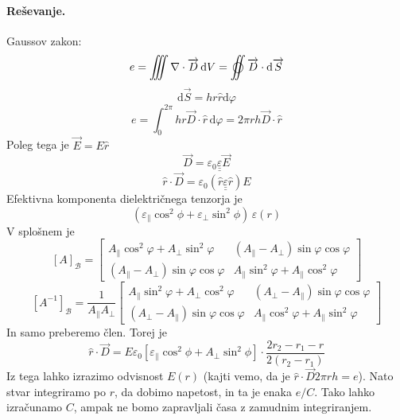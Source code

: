 \documentclass[a4paper]{article}
\newcommand{\vct}[1]{\overrightarrow{#1}}
\newcommand{\dif}{\mathrm{d}}
\newcommand{\duline}[1]{\underline{\underline{#1}}}
\begin{document}
\paragraph{Reševanje.} Gaussov zakon:
$$e = \iiint \nabla \cdot \vct{D} \, \dif V = \varoiint \vct{D}\cdot\dif\vct{S}$$
$$\dif \vct{S} = h r\widehat{r} \dif \varphi$$
$$e = \int_{0}^{2\pi} hr \vct{D} \cdot \widehat{r}\,\dif\varphi = 2\pi r h \vct{D}\cdot\widehat{r}$$
Poleg tega je $\vct{E} = E\widehat{r}$
$$\vct{D} = \varepsilon_0\duline{\varepsilon}\vct{E}$$
$$\widehat{r}\cdot\vct{D} = \varepsilon_0 \left(\widehat{r}\duline{\varepsilon}\widehat{r}\right)E$$
Efektivna komponenta dielektričnega tenzorja je $$(\varepsilon_\parallel \cos^2\phi + \varepsilon_\perp \sin^2\phi)\,\varepsilon(r)$$
V splošnem je $$[A]_\mathcal{B} = \begin{bmatrix}
    A_\parallel \cos^2\varphi + A_\perp \sin^2\varphi & (A_\parallel - A_\perp) \sin\varphi \cos\varphi \\
    (A_\parallel - A_\perp) \sin\varphi \cos\varphi & A_\parallel \sin^2\varphi + A_\parallel \cos^2 \varphi
\end{bmatrix}$$
$$[A^{-1}]_\mathcal{B} = \frac{1}{A_\parallel A_\perp} \begin{bmatrix}
    A_\parallel \sin^2\varphi + A_\perp \cos^2\varphi & (A_\perp - A_\parallel) \sin\varphi \cos\varphi \\
    (A_\perp - A_\parallel) \sin\varphi \cos\varphi & A_\parallel \cos^2\varphi + A_\parallel \sin^2 \varphi
\end{bmatrix}$$
In samo preberemo člen. Torej je
$$\widehat{r}\cdot\vct{D} = E\varepsilon_0\left[\varepsilon_\parallel \cos^2\phi + A_\perp \sin^2\phi\right] \cdot \frac{2r_2 - r_1 - r}{2(r_2 - r_1)}$$
Iz tega lahko izrazimo odvisnost $E(r)$ (kajti vemo, da je $\widehat{r} \cdot \vct{D} 2\pi r h = e$). Nato stvar integriramo po $r$, da dobimo napetost, in ta je enaka $e/C$. Tako lahko izračunamo $C$, ampak ne bomo zapravljali časa z zamudnim integriranjem.
\end{document}
